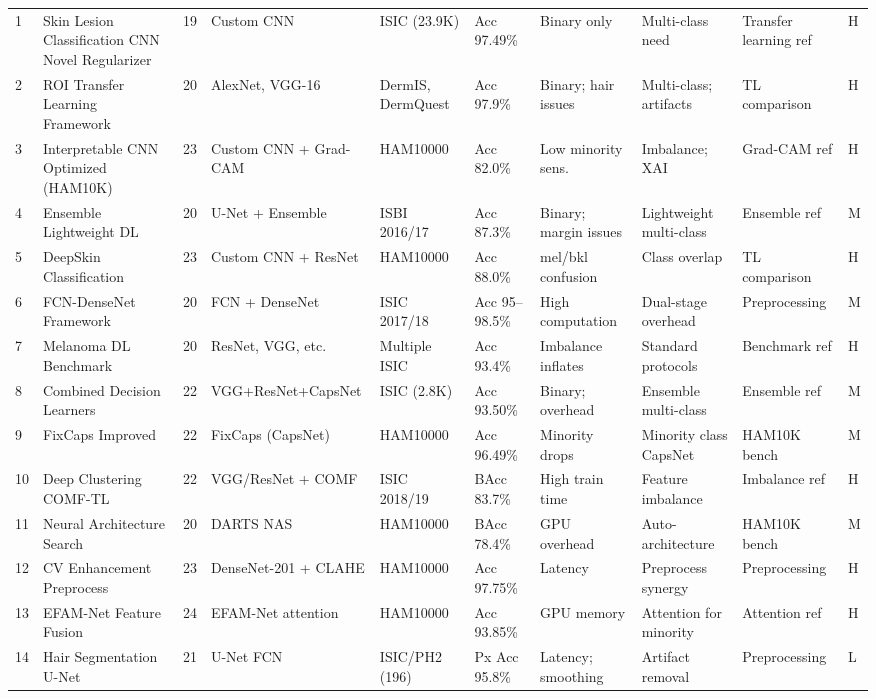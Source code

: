 \documentclass[11pt,a4paper]{article}
\begin{document}
\begin{landscape}
{\begin{longtable}{C{0.4cm} L{3cm} C{0.5cm} L{2.2cm} L{2.2cm} L{1.7cm} L{2cm} L{2.2cm} L{2.2cm} C{0.8cm}}
1 & Skin Lesion Classification CNN Novel Regularizer & 19 & Custom CNN & ISIC (23.9K) & Acc 97.49\% & Binary only & Multi-class need & Transfer learning ref & H \\
2 & ROI Transfer Learning Framework & 20 & AlexNet, VGG-16 & DermIS, DermQuest & Acc 97.9\% & Binary; hair issues & Multi-class; artifacts & TL comparison & H \\
3 & Interpretable CNN Optimized (HAM10K) & 23 & Custom CNN + Grad-CAM & HAM10000 & Acc 82.0\% & Low minority sens. & Imbalance; XAI & Grad-CAM ref & H \\
4 & Ensemble Lightweight DL & 20 & U-Net + Ensemble & ISBI 2016/17 & Acc 87.3\% & Binary; margin issues & Lightweight multi-class & Ensemble ref & M \\
5 & DeepSkin Classification & 23 & Custom CNN + ResNet & HAM10000 & Acc 88.0\% & mel/bkl confusion & Class overlap & TL comparison & H \\
6 & FCN-DenseNet Framework & 20 & FCN + DenseNet & ISIC 2017/18 & Acc 95--98.5\% & High computation & Dual-stage overhead & Preprocessing & M \\
7 & Melanoma DL Benchmark & 20 & ResNet, VGG, etc. & Multiple ISIC & Acc 93.4\% & Imbalance inflates & Standard protocols & Benchmark ref & H \\
8 & Combined Decision Learners & 22 & VGG+ResNet+CapsNet & ISIC (2.8K) & Acc 93.50\% & Binary; overhead & Ensemble multi-class & Ensemble ref & M \\
9 & FixCaps Improved & 22 & FixCaps (CapsNet) & HAM10000 & Acc 96.49\% & Minority drops & Minority class CapsNet & HAM10K bench & M \\
10 & Deep Clustering COMF-TL & 22 & VGG/ResNet + COMF & ISIC 2018/19 & BAcc 83.7\% & High train time & Feature imbalance & Imbalance ref & H \\
11 & Neural Architecture Search & 20 & DARTS NAS & HAM10000 & BAcc 78.4\% & GPU overhead & Auto-architecture & HAM10K bench & M \\
12 & CV Enhancement Preprocess & 23 & DenseNet-201 + CLAHE & HAM10000 & Acc 97.75\% & Latency & Preprocess synergy & Preprocessing & H \\
13 & EFAM-Net Feature Fusion & 24 & EFAM-Net attention & HAM10000 & Acc 93.85\% & GPU memory & Attention for minority & Attention ref & H \\
14 & Hair Segmentation U-Net & 21 & U-Net FCN & ISIC/PH2 (196) & Px Acc 95.8\% & Latency; smoothing & Artifact removal & Preprocessing & L \\

\end{longtable}}
\end{landscape}
\end{document}
